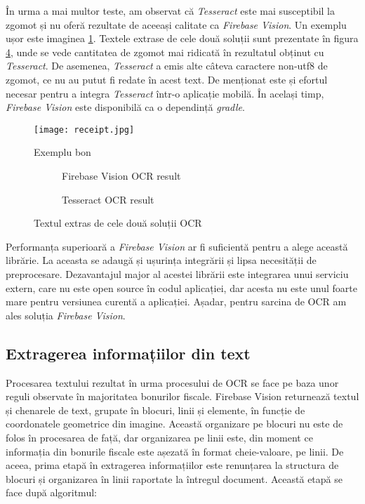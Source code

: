 În urma a mai multor teste, am observat că \emph{Tesseract} este mai susceptibil la zgomot și nu oferă rezultate de aceeași calitate ca \emph{Firebase Vision}. Un exemplu ușor este imaginea \ref{fig:exampleReceipt}. Textele extrase de cele două soluții sunt prezentate în figura \ref{fig:ocrResults}, unde se vede cantitatea de zgomot mai ridicată în rezultatul obținut cu \emph{Tesseract}. De asemenea, \emph{Tesseract} a emis alte câteva caractere non-utf8 de zgomot, ce nu au putut fi redate în acest text. De menționat este și efortul necesar pentru a integra \emph{Tesseract} într-o aplicație mobilă. În același timp, \emph{Firebase Vision} este disponibilă ca o dependință \emph{gradle}.

\begin{figure}[hb]
  \centering
  \texttt{[image: receipt.jpg]}
  \caption{Exemplu bon}
  \label{fig:exampleReceipt}
\end{figure}

\begin{figure}
  \begin{subfigure}{0.48\textwidth}
  
  \caption{Firebase Vision OCR result}
  \label{fig:firebaseResult}
  \end{subfigure}
  \hfill
  \begin{subfigure}{0.48\textwidth}
  
  \caption{Tesseract OCR result}
  \label{fig:tesseractResult}
  \end{subfigure}
  \caption{Textul extras de cele două soluții OCR}
  \label{fig:ocrResults}
\end{figure}

Performanța superioară a \emph{Firebase Vision} ar fi suficientă pentru a alege această librărie. La aceasta se adaugă și ușurința integrării și lipsa necesității de preprocesare. Dezavantajul major al acestei librării este integrarea unui serviciu extern, care nu este open source în codul aplicației, dar acesta nu este unul foarte mare pentru versiunea curentă a aplicației. Așadar, pentru sarcina de OCR am ales soluția \emph{Firebase Vision}.

\subsection{Extragerea informațiilor din text}

Procesarea textului rezultat în urma procesului de OCR se face pe baza unor reguli observate în majoritatea bonurilor fiscale. Firebase Vision returnează textul și chenarele de text, grupate în blocuri, linii și elemente, în funcție de coordonatele geometrice din imagine. Această organizare pe blocuri nu este de folos în procesarea de față, dar organizarea pe linii este, din moment ce informația din bonurile fiscale este așezată în format cheie-valoare, pe linii. De aceea, prima etapă în extragerea informațiilor este renunțarea la structura de blocuri și organizarea în linii raportate la întregul document. Această etapă se face după algoritmul:

